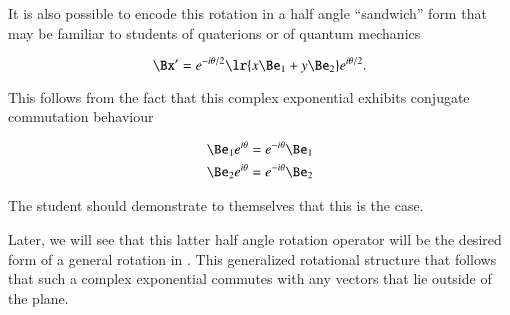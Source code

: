 It is also possible to encode this rotation in a half angle ``sandwich'' form that may be familiar to students of quaterions or of quantum mechanics

\begin{dmath}\label{eqn:SimpleProducts2:460}
\Bx'
= e^{-i\theta/2} \lr{ x \Be_1 + y \Be_2 } e^{i \theta/2}.
\end{dmath}

This follows from the fact that this complex exponential exhibits conjugate commutation behaviour

\begin{dmath}\label{eqn:SimpleProducts2:480}
\begin{aligned}
   \Be_1 e^{i\theta} &= e^{-i\theta} \Be_1 \\
   \Be_2 e^{i\theta} &= e^{-i\theta} \Be_2 \\
\end{aligned}
\end{dmath}

The student should demonstrate to themselves that this is the case.

Later, we will see that this latter half angle rotation operator will be the desired form of a general rotation in .  This generalized rotational structure that follows that such a complex exponential commutes with any vectors that lie outside of the plane.

